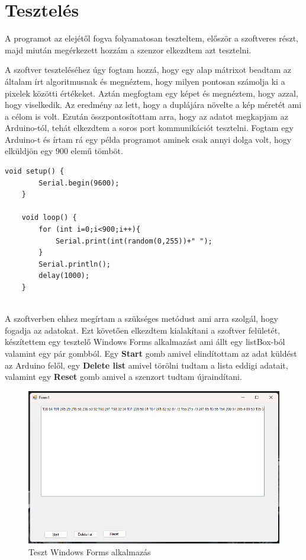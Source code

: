 \documentclass[]{thesis-ekf}
\theoremstyle{definition}
\theoremstyle{remark}
\begin{document}
\chapter{Tesztelés}
A programot az elejétől fogva folyamatosan teszteltem, először a szoftveres részt, majd miután megérkezett hozzám a szenzor elkezdtem azt tesztelni. 

A szoftver teszteléséhez úgy fogtam hozzá, hogy egy alap mátrixot beadtam az általam írt algoritmusnak és megnéztem, hogy milyen pontosan számolja ki a pixelek közötti értékeket. Aztán megfogtam egy képet és megnéztem, hogy azzal, hogy viselkedik. Az eredmény az lett, hogy a duplájára növelte a kép méretét ami a célom is volt. Ezután összpontosítottam arra, hogy az adatot megkapjam az Arduino-tól, tehát elkezdtem a soros port kommunikációt tesztelni. Fogtam egy Arduino-t és írtam rá egy példa programot aminek csak annyi dolga volt, hogy elküldjön egy 900 elemű tömböt.

\begin{lstlisting}[language=Arduino]
	void setup() {
		Serial.begin(9600);
	}
	
	void loop() {
		for (int i=0;i<900;i++){
			Serial.print(int(random(0,255))+" ");
		} 
		Serial.println();
		delay(1000);
	}
	
\end{lstlisting}

A szoftverben ehhez megírtam a szükséges metódust ami arra szolgál, hogy fogadja az adatokat. Ezt követően elkezdtem kialakítani a szoftver felületét, készítettem egy tesztelő Windows Forms alkalmazást ami állt egy listBox-ból valamint egy pár gombból. Egy \textbf{Start} gomb amivel elindítottam az adat küldést az Arduino felől, egy \textbf{Delete list} amivel törölni tudtam a lista eddigi adatait, valamint egy \textbf{Reset} gomb amivel a szenzort tudtam újraindítani. 
\pagebreak
\begin{figure}[th!]
	\centering
	\includegraphics[width=0.7\linewidth]{tesztalkalmazas}
	\caption[Teszt alkalmazás]{Teszt Windows Forms alkalmazás}
	\label{fig:tesztalkalmazas}
\end{figure}
\end{document}
